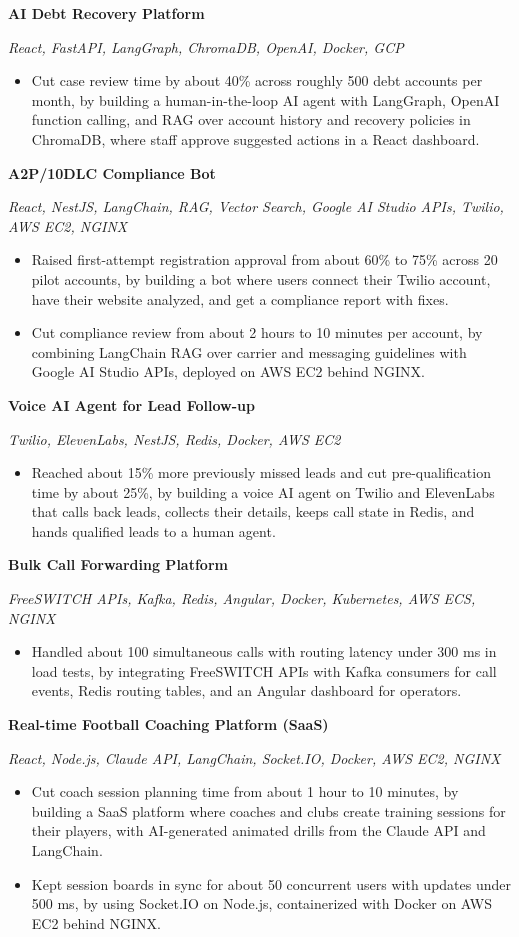 \documentclass[a4paper,10pt]{article}
\newcommand{\project}[2]{\vspace{2pt}\textbf{#1}\par\textit{#2}\par\vspace{1pt}}
\begin{document}
\project{AI Debt Recovery Platform}{React, FastAPI, LangGraph, ChromaDB, OpenAI, Docker, GCP}
\begin{itemize}
  \item Cut case review time by about 40\% across roughly 500 debt accounts per month, by building a human-in-the-loop AI agent with LangGraph, OpenAI function calling, and RAG over account history and recovery policies in ChromaDB, where staff approve suggested actions in a React dashboard.
\end{itemize}

\project{A2P/10DLC Compliance Bot}{React, NestJS, LangChain, RAG, Vector Search, Google AI Studio APIs, Twilio, AWS EC2, NGINX}
\begin{itemize}
  \item Raised first-attempt registration approval from about 60\% to 75\% across 20 pilot accounts, by building a bot where users connect their Twilio account, have their website analyzed, and get a compliance report with fixes.
  \item Cut compliance review from about 2 hours to 10 minutes per account, by combining LangChain RAG over carrier and messaging guidelines with Google AI Studio APIs, deployed on AWS EC2 behind NGINX.
\end{itemize}
\newpage
\project{Voice AI Agent for Lead Follow-up}{Twilio, ElevenLabs, NestJS, Redis, Docker, AWS EC2}
\begin{itemize}
  \item Reached about 15\% more previously missed leads and cut pre-qualification time by about 25\%, by building a voice AI agent on Twilio and ElevenLabs that calls back leads, collects their details, keeps call state in Redis, and hands qualified leads to a human agent.
\end{itemize}

\project{Bulk Call Forwarding Platform}{FreeSWITCH APIs, Kafka, Redis, Angular, Docker, Kubernetes, AWS ECS, NGINX}
\begin{itemize}
  \item Handled about 100 simultaneous calls with routing latency under 300 ms in load tests, by integrating FreeSWITCH APIs with Kafka consumers for call events, Redis routing tables, and an Angular dashboard for operators.
\end{itemize}

\project{Real-time Football Coaching Platform (SaaS)}{React, Node.js, Claude API, LangChain, Socket.IO, Docker, AWS EC2, NGINX}
\begin{itemize}
  \item Cut coach session planning time from about 1 hour to 10 minutes, by building a SaaS platform where coaches and clubs create training sessions for their players, with AI-generated animated drills from the Claude API and LangChain.
  \item Kept session boards in sync for about 50 concurrent users with updates under 500 ms, by using Socket.IO on Node.js, containerized with Docker on AWS EC2 behind NGINX.
\end{itemize}
\end{document}
